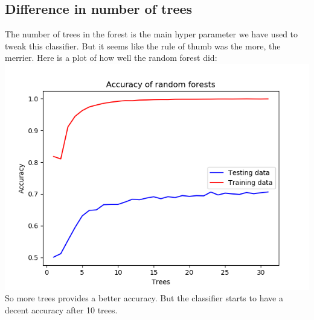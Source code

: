 \documentclass[a4paper,norsk]{article}
\begin{document}
\subsection{Difference in number of trees}
The number of trees in the forest is the main hyper parameter we have used to tweak this classifier. But it seems like the rule of thumb was the more, the merrier.
Here is a plot of how well the random forest did:\\
\includegraphics[scale=.7]{images/32treesAcc}\\
So more trees provides a better accuracy. But the classifier starts to have a decent accuracy after 10 trees.
\end{document}
